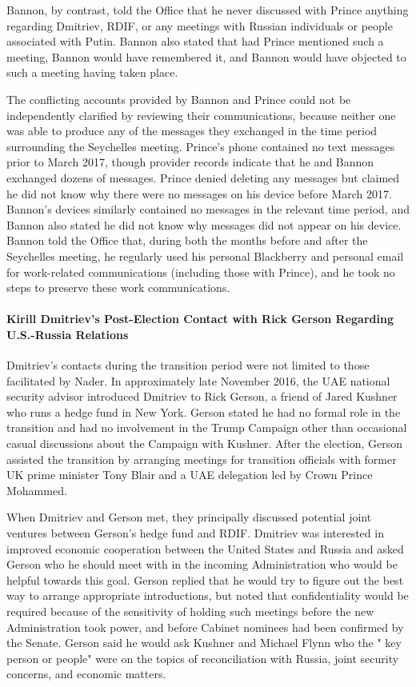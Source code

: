 Bannon, by contrast, told the Office that he never discussed with Prince anything regarding Dmitriev, RDIF, or any meetings with Russian individuals or people associated with Putin.%
Bannon also stated that had Prince mentioned such a meeting, Bannon would have remembered it, and Bannon would have objected to such a meeting having taken place.%

The conflicting accounts provided by Bannon and Prince could not be independently clarified by reviewing their communications, because neither one was able to produce any of the messages they exchanged in the time period surrounding the Seychelles meeting. Prince's phone contained no text messages prior to March 2017, though provider records indicate that he and Bannon exchanged dozens of messages.%
Prince denied deleting any messages but claimed he did not know why there were no messages on his device before March 2017.%
Bannon's devices similarly contained no messages in the relevant time period, and Bannon also stated he did not know why messages did not appear on his device.%
Bannon told the Office that, during both the months before and after the Seychelles meeting, he regularly used his personal Blackberry and personal email for work-related communications (including those with Prince), and he took no steps to preserve these work communications.%

\paragraph{Kirill Dmitriev's Post-Election Contact with Rick Gerson Regarding U.S.-Russia Relations}

Dmitriev's contacts during the transition period were not limited to those facilitated by Nader. In approximately late November 2016, the UAE national security advisor introduced Dmitriev to Rick Gerson, a friend of Jared Kushner who runs a hedge fund in New York.%
Gerson stated he had no formal role in the transition and had no involvement in the Trump Campaign other than occasional casual discussions about the Campaign with Kushner.%
After the election, Gerson assisted the transition by arranging meetings for transition officials with former UK prime minister Tony Blair and a UAE delegation led by Crown Prince Mohammed.%

When Dmitriev and Gerson met, they principally discussed potential joint ventures between Gerson's hedge fund and RDIF.%
Dmitriev was interested in improved economic cooperation between the United States and Russia and asked Gerson who he should meet with in the incoming Administration who would be helpful towards this goal.%
Gerson replied that he would try to figure out the best way to arrange appropriate introductions, but noted that confidentiality would be required because of the sensitivity of holding such meetings before the new Administration took power, and before Cabinet nominees had been confirmed by the Senate.%
Gerson said he would ask Kushner and Michael Flynn who the " key person or people" were on the topics of reconciliation with Russia, joint security concerns, and economic matters.%

